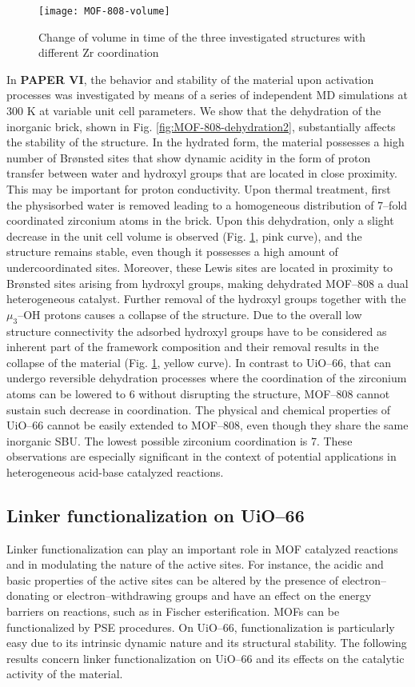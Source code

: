 \npar
\begin{figure}[!htbp]
	\centering
	\texttt{[image: MOF-808-volume]}
	\caption{Change of volume in time of the three investigated structures with different Zr coordination}
	\label{fig:MOF-808-volume}
\end{figure}
In \textbf{PAPER VI}, the behavior and stability of the material upon activation processes was investigated by means of a series of independent MD simulations at 300 K at variable unit cell parameters. We show that the dehydration of the inorganic brick, shown in Fig. \ref{fig:MOF-808-dehydration2}, substantially affects the stability of the structure. In the hydrated form, the material possesses a high number of Br\o{}nsted sites that show dynamic acidity in the form of proton transfer between water and hydroxyl groups that are located in close proximity. This may be important for proton conductivity. Upon thermal treatment, first the physisorbed water is removed leading to a homogeneous distribution of 7--fold coordinated zirconium atoms in the brick. Upon this dehydration, only a slight decrease in the unit cell volume is observed (Fig. \ref{fig:MOF-808-volume}, pink curve), and the structure remains stable, even though it possesses a high amount of undercoordinated sites. Moreover, these Lewis sites are located in proximity to Br\o{}nsted sites arising from hydroxyl groups, making dehydrated MOF--808 a dual heterogeneous catalyst. Further removal of the hydroxyl groups together with the $\mu_3$--OH protons causes a collapse of the structure. Due to the overall low structure connectivity the adsorbed hydroxyl groups have to be considered as inherent part of the framework composition and their removal results in the collapse of the material (Fig. \ref{fig:MOF-808-volume}, yellow curve). In contrast to UiO--66, that can undergo reversible dehydration processes where the coordination of the zirconium atoms can be lowered to 6 without disrupting the structure, MOF--808 cannot sustain such decrease in coordination. The physical and chemical properties of UiO--66 cannot be easily extended to MOF--808, even though they share the same inorganic SBU. The lowest possible zirconium coordination is 7. These observations are especially significant in the context of potential applications in heterogeneous acid-base catalyzed reactions.

\subsection*{Linker functionalization on UiO--66}
Linker functionalization can play an important role in MOF catalyzed reactions and in modulating the nature of the active sites. For instance, the acidic and basic properties of the active sites can be altered by the presence of electron--donating or electron--withdrawing groups and have an effect on the energy barriers on reactions, such as in Fischer esterification. MOFs can be functionalized by PSE procedures. On UiO--66, functionalization is particularly easy due to its intrinsic dynamic nature and its structural stability. The following results concern linker functionalization on UiO--66 and its effects on the catalytic activity of the material. 

